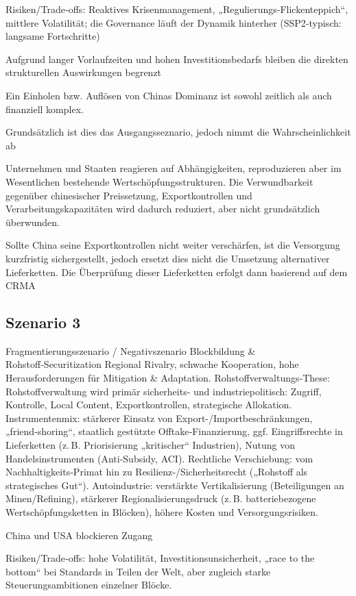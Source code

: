\documentclass[12pt,a4paper,oneside]{book} %
\begin{document}
Risiken/Trade‑offs: Reaktives Krisenmanagement, „Regulierungs‑Flickenteppich“, mittlere Volatilität; die Governance läuft der Dynamik hinterher (SSP2‑typisch: langsame Fortschritte)

Aufgrund langer Vorlaufzeiten und hohen Investitionsbedarfs bleiben die direkten strukturellen Auswirkungen begrenzt

Ein Einholen bzw. Auflösen von Chinas Dominanz ist sowohl zeitlich als auch finanziell komplex.

Grundsätzlich ist dies das Ausgangsseznario, jedoch nimmt die Wahrscheinlichkeit ab

Unternehmen und Staaten reagieren auf Abhängigkeiten, reproduzieren aber im Wesentlichen bestehende Wertschöpfungsstrukturen. Die Verwundbarkeit gegenüber chinesischer Preissetzung, Exportkontrollen und Verarbeitungskapazitäten wird dadurch reduziert, aber nicht grundsätzlich überwunden.

Sollte China seine Exportkontrollen nicht weiter verschärfen, ist die Versorgung kurzfristig sichergestellt, jedoch ersetzt dies nicht die Umsetzung alternativer Lieferketten. Die Überprüfung dieser Lieferketten erfolgt dann basierend auf dem CRMA

\subsection{Szenario 3}
Fragmentierungsszenario / Negativszenario
Blockbildung \& Rohstoff‑Securitization
Regional Rivalry, schwache Kooperation, hohe Herausforderungen für Mitigation & Adaptation. 
Rohstoffverwaltungs‑These: Rohstoffverwaltung wird primär sicherheits‑ und industriepolitisch: Zugriff, Kontrolle, Local Content, Exportkontrollen, strategische Allokation.
Instrumentenmix: stärkerer Einsatz von Export-/Importbeschränkungen, „friend‑shoring“, staatlich gestützte Offtake‑Finanzierung, ggf. Eingriffsrechte in Lieferketten (z. B. Priorisierung „kritischer“ Industrien), Nutung von Handelsinstrumenten (Anti-Subsidy, ACI).
Rechtliche Verschiebung: vom Nachhaltigkeits‑Primat hin zu Resilienz‑/Sicherheitsrecht („Rohstoff als strategisches Gut“).
Autoindustrie: verstärkte Vertikalisierung (Beteiligungen an Minen/Refining), stärkerer Regionalisierungsdruck (z. B. batteriebezogene Wertschöpfungsketten in Blöcken), höhere Kosten und Versorgungsrisiken.

China und USA blockieren Zugang

Risiken/Trade‑offs: hohe Volatilität, Investitionsunsicherheit, „race to the bottom“ bei Standards in Teilen der Welt, aber zugleich starke Steuerungsambitionen einzelner Blöcke.
\end{document}
